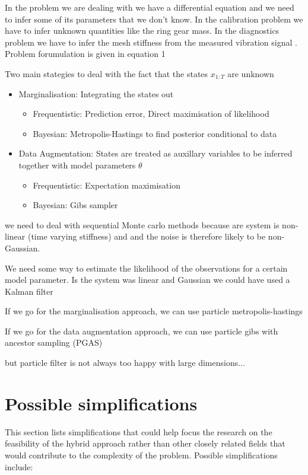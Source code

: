 In the problem we are dealing with we have a differential equation and we need to infer some of its parameters that we don't know. In the calibration problem we have to infer unknown quantities like the ring gear mass. In the diagnostics problem we have to infer the mesh stiffness from the measured vibration signal
\cite{Schon2015}. Problem forumulation is given in equation 1

Two main stategies to deal with the fact that the states $x_{1:T}$ are unknown

\begin{itemize}
	\item Marginalisation: Integrating the states out
	 \begin{itemize}
		\item Frequentistic: Prediction error, Direct maximisation of likelihood
		\item Bayesian: Metropolis-Hastings to find posterior conditional to data
	\end{itemize}

	\item Data Augmentation: States are treated as auxillary variables to be inferred together with model parameters $\theta$
	\begin{itemize}
		\item Frequentistic: Expectation maximisation
		\item Bayesian: Gibs sampler
	\end{itemize}
\end{itemize}

we need to deal with sequential Monte carlo methods because are system is non-linear (time varying stiffness) and and the noise is therefore likely to be non-Gaussian. 

We need some way to estimate the likelihood of the observations for a certain model parameter. Is the system was linear and Gaussian we could have used a Kalman filter 

If we go for the marginalisation approach, we can use particle metropolis-hastings 

If we go for the data augmentation approach, we can use particle gibs with ancestor sampling (PGAS)

but particle filter is not always too happy with large dimensions...


\section{Possible simplifications}
This section lists simplifications that could help focus the research on the feasibility of the hybrid approach rather than other closely related fields that would contribute to the complexity of the problem. Possible simplifications include:

